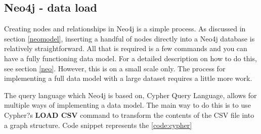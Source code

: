 \subsection*{Neo4j - data load}
Creating nodes and relationships in Neo4j is a simple process. As discussed in section \ref{neomodel}, inserting a handful of nodes directly into a Neo4j database is relatively straightforward. All that is required is a few commands and you can have a fully functioning data model. For a detailed description on how to do this, see section \ref{neo}. However, this is on a small scale only. The process for implementing a full data model with a large dataset requires a little more work.

The query language which Neo4j is based on, Cypher Query Language, allows for multiple ways of implementing a data model. The main way to do this is to use Cypher?s \textbf{LOAD CSV} command to transform the contents of the CSV file into a graph structure. Code snippet represents the \ref{code:cypher}







